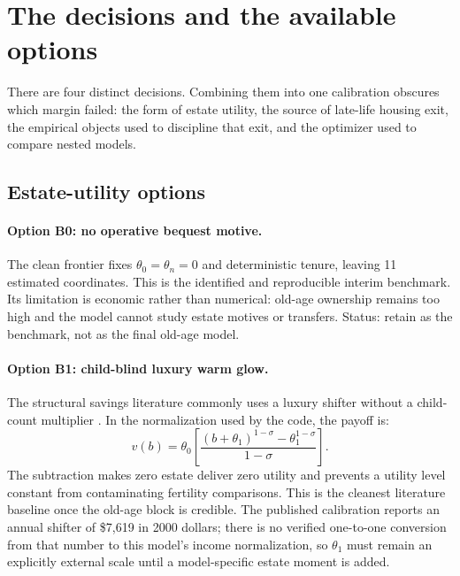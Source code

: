 \documentclass[10pt]{article}
\newcommand{\good}{\textcolor{green!45!black}{retain}}
\begin{document}
\section{The decisions and the available options}

There are four distinct decisions. Combining them into one calibration obscures
which margin failed: the form of estate utility, the source of late-life
housing exit, the empirical objects used to discipline that exit, and the
optimizer used to compare nested models.

\subsection{Estate-utility options}

\paragraph{Option B0: no operative bequest motive.}
The clean frontier fixes $\theta_0=\theta_n=0$ and deterministic tenure, leaving
11 estimated coordinates. This is the identified and reproducible interim
benchmark. Its limitation is economic rather than numerical: old-age
ownership remains too high and the model cannot study estate motives or
transfers. Status: \good{} as the benchmark, not as the final old-age model.

\paragraph{Option B1: child-blind luxury warm glow.}
The structural savings literature commonly uses a luxury shifter without a
child-count multiplier \citep{denardi2004,lockwood2018,nakajima2017}. In the
normalization used by the code, the payoff is:
\begin{equation}
v(b)=\theta_0\left[
\frac{(b+\theta_1)^{1-\sigma}-\theta_1^{1-\sigma}}{1-\sigma}
\right].
\label{eq:childblind}
\end{equation}
The subtraction makes zero estate deliver zero utility and prevents a utility
level constant from contaminating fertility comparisons. This is the cleanest
literature baseline once the old-age block is credible. The published
\citet{nakajima2017} calibration reports an annual shifter of \$7,619 in 2000
dollars; there is no verified one-to-one conversion from that number to this
model's income normalization, so $\theta_1$ must remain an explicitly external
scale until a model-specific estate moment is added.
\end{document}
